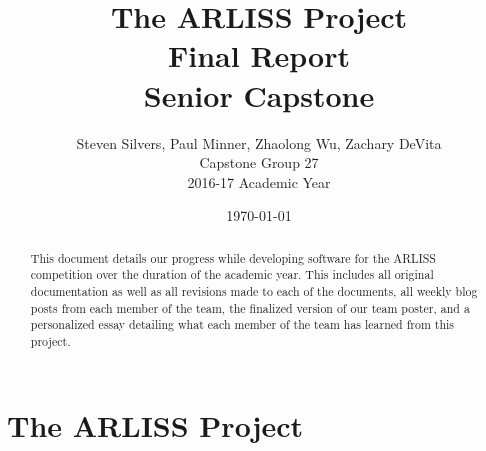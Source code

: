 \documentclass[10pt,letterpaper,onecolumn,draftclsnofoot,journal]{IEEEtran}
\begin{document}
\begin{titlepage}
	\title{The ARLISS Project\\Final Report\\Senior Capstone}
	\author{Steven Silvers, Paul Minner, Zhaolong Wu, Zachary DeVita\\
		Capstone Group 27\\2016-17 Academic Year}
	\date{\today}
	\maketitle
	\vspace{4cm}
	\begin{abstract}
		\noindent This document details our progress while developing software for the ARLISS competition over the duration of the academic year. This includes all original documentation as well as all revisions made to each of the documents, all weekly blog posts from each member of the team, the finalized version of our team poster, and a personalized essay detailing what each member of the team has learned from this project.
	\end{abstract}

\end{titlepage}
\begingroup
  \flushbottom
  \setlength{\parskip}{0pt plus .1fil}%
  \tableofcontents
  \newpage
\endgroup

\section{\textbf{The ARLISS Project}}
\end{document}
